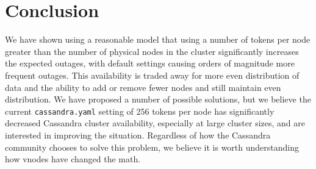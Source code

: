 \documentclass{article}
\begin{document}
\section{Conclusion}

We have shown using a reasonable model that using a number of tokens per node
greater than the number of physical nodes in the cluster significantly increases
the expected outages, with default settings causing orders of magnitude more
frequent outages. This availability is traded away for more even distribution
of data and the ability to add or remove fewer nodes and still maintain even
distribution. We have proposed a number of possible solutions, but we believe
the current \texttt{cassandra.yaml} setting of 256 tokens per node has
significantly decreased Cassandra cluster availability, especially at large
cluster sizes, and are interested in improving the situation. Regardless of
how the Cassandra community chooses to solve this problem, we believe it is
worth understanding how vnodes have changed the math.
\end{document}
